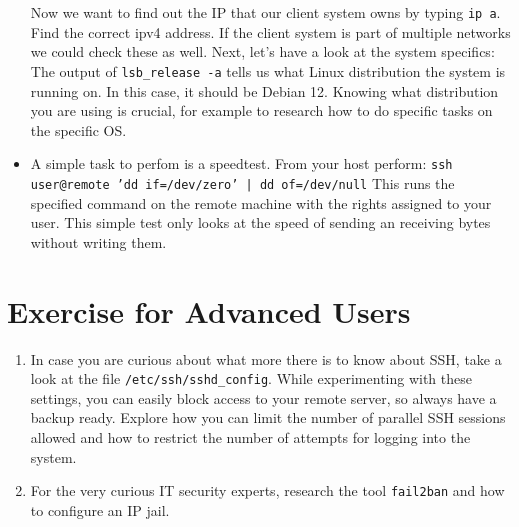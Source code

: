 \documentclass{dcbl/challenge}
\begin{document}
\begin{aufgabe}
\begin{itemize}
        Now we want to find out the IP that our client system owns by typing \texttt{ip a}. Find the correct ipv4 address. If the client system is part of multiple networks we could check these as well. 
        Next, let's have a look at the system specifics: The output of \texttt{lsb_release -a} tells us what Linux distribution the system is running on. In this case, it should be Debian 12.
        Knowing what distribution you are using is crucial, for example to research how to do specific tasks on the specific OS.
    \item A simple task to perfom is a speedtest. From your host perform: \texttt{ssh user@remote 'dd if=/dev/zero' | dd of=/dev/null} This runs the specified command on the remote machine with the rights assigned to your user. This simple test only looks at the speed of sending an receiving bytes without writing them.
    
\end{itemize}
\end{aufgabe}

\section*{Exercise for Advanced Users}
\begin{enumerate}
    \item In case you are curious about what more there is to know about SSH, take a look at the file \texttt{/etc/ssh/sshd\_config}. While experimenting with these settings, you can easily block access to your remote server, so always have a backup ready. Explore how you can limit the number of parallel SSH sessions allowed and how to restrict the number of attempts for logging into the system.

    \item For the very curious IT security experts, research the tool \texttt{fail2ban} and how to configure an IP jail.
\end{enumerate}
\end{document}
